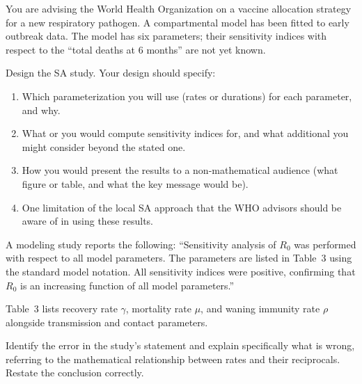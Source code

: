 \begin{exercise}[\bloom{L5}]
\label{ex:ch2:studydesign}
You are advising the World Health Organization on a vaccine allocation
strategy for a new respiratory pathogen. A compartmental model has been
fitted to early outbreak data. The model has six parameters; their
sensitivity indices with respect to the \QOI ``total deaths at 6 months''
are not yet known.

Design the SA study. Your design should specify:
\begin{enumerate}[label=(\alph*)]
  \item Which parameterization you will use (rates or durations) for each
        parameter, and why.
  \item What \QOI or \QOIs you would compute sensitivity indices for,
        and what additional \QOI you might consider beyond the stated one.
  \item How you would present the results to a non-mathematical
        audience (what figure or table, and what the key message would be).
  \item One limitation of the local SA approach that the WHO advisors
        should be aware of in using these results.
\end{enumerate}
\end{exercise}

\begin{exercise}[\bloom{L6}]
\label{ex:ch2:critique}
A modeling study reports the following: ``Sensitivity analysis of
$R_0$ was performed with respect to all model parameters.
The parameters are listed in Table~3 using the standard model notation.
All sensitivity indices were positive, confirming that $R_0$ is
an increasing function of all model parameters.''

Table~3 lists recovery rate $\gamma$, mortality rate $\mu$, and
waning immunity rate $\rho$ alongside transmission and contact parameters.

Identify the error in the study's statement and explain specifically
what is wrong, referring to the mathematical relationship between
rates and their reciprocals. Restate the conclusion correctly.
\end{exercise}


